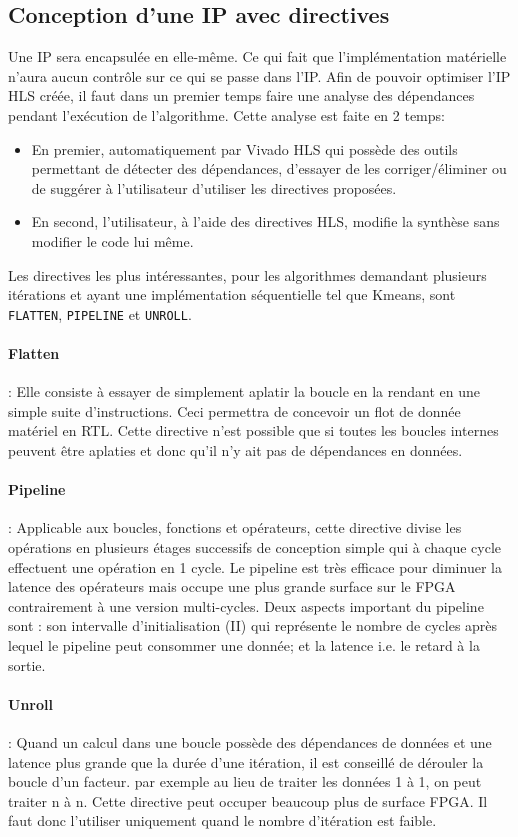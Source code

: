 \documentclass[12pt,a4paper]{article}
\begin{document}
\subsection{Conception d'une IP avec directives}
Une IP sera encapsulée en elle-même. Ce qui fait que l'implémentation matérielle n'aura aucun contrôle sur ce qui se passe dans l'IP.
Afin de pouvoir optimiser l'IP HLS créée, il faut dans un premier temps faire une analyse des dépendances pendant l'exécution de l'algorithme. Cette analyse est faite en 2 temps: 
\begin{itemize}
\item En premier, automatiquement par Vivado HLS qui possède des outils permettant de détecter des dépendances, d'essayer de les corriger/éliminer ou de suggérer à l'utilisateur d'utiliser les directives proposées.
\item En second, l'utilisateur, à l'aide des directives HLS, modifie la synthèse sans modifier le code lui même.
\end{itemize}
 Les directives les plus intéressantes, pour les algorithmes demandant plusieurs itérations et ayant une implémentation séquentielle tel que Kmeans, sont \texttt{FLATTEN}, \texttt{PIPELINE} et \texttt{UNROLL}.
 
\paragraph{Flatten} : Elle consiste à essayer de simplement aplatir la boucle en la rendant en une simple suite d'instructions. Ceci permettra de concevoir un flot de donnée matériel en RTL. Cette directive n'est possible que si toutes les boucles internes peuvent être aplaties et donc qu'il n'y ait pas de dépendances en données.
\paragraph{Pipeline} : Applicable aux boucles, fonctions et opérateurs, cette directive divise les opérations en plusieurs étages successifs de conception simple qui à chaque cycle effectuent une opération en 1 cycle. Le pipeline est très efficace pour diminuer la latence des opérateurs mais occupe une plus grande surface sur le FPGA contrairement à une version multi-cycles. Deux aspects important du pipeline sont : son intervalle d'initialisation (II) qui représente le nombre de cycles après lequel le pipeline peut consommer une donnée; et la latence i.e. le retard à la sortie.

\paragraph{Unroll} : Quand un calcul dans une boucle possède des dépendances de données et une latence plus grande que la durée d'une itération, il est conseillé de dérouler la boucle d'un facteur. par exemple au lieu de traiter les données 1 à 1, on peut traiter n à n. Cette directive peut occuper beaucoup plus de surface FPGA. Il faut donc l'utiliser uniquement quand le nombre d'itération est faible.
\end{document}
